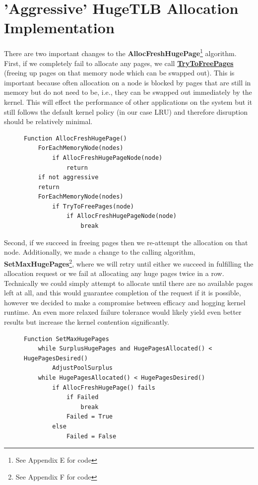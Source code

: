\documentclass{article}
\begin{document}
\section{'Aggressive' HugeTLB Allocation Implementation}
There are two important changes to the \textbf{AllocFreshHugePage}\footnote{See Appendix E for code}  algorithm. First, if we completely fail to allocate any pages, we call \href{http://lxr.free-electrons.com/source/mm/vmscan.c?v=3.10#L2358}{\textbf{TryToFreePages}} (freeing up pages on that memory node which can be swapped out). This is important because often allocation on a node is blocked by pages that are still in memory but do not need to be, i.e., they can be swapped out immediately by the kernel. This will effect the performance of other applications on the system but it still follows the default kernel policy (in our case LRU) and therefore disruption should be relatively minimal.

\begin{figure}[h]
\begin{verbatim}
Function AllocFreshHugePage()
    ForEachMemoryNode(nodes)
        if AllocFreshHugePageNode(node)
            return
    if not aggressive
	return
    ForEachMemoryNode(nodes)
        if TryToFreePages(node)
            if AllocFreshHugePageNode(node)
                break
\end{verbatim}
\end{figure}

Second, if we succeed in freeing pages then we re-attempt the allocation on that node. Additionally, we made a change to the calling algorithm, \textbf{SetMaxHugePages}\footnote{See Appendix F for code}, where we will retry until either we succeed in fulfilling the allocation request or we fail at allocating any huge pages twice in a row. Technically we could simply attempt to allocate until there are no available pages left at all, and this would guarantee completion of the request if it is possible, however we decided to make a compromise between efficacy and hogging kernel runtime. An even more relaxed failure tolerance would likely yield even better results but increase the kernel contention significantly.

\begin{figure}[h]
\begin{verbatim}
Function SetMaxHugePages
    while SurplusHugePages and HugePagesAllocated() < HugePagesDesired()
        AdjustPoolSurplus
    while HugePagesAllocated() < HugePagesDesired()
        if AllocFreshHugePage() fails
            if Failed
                break
            Failed = True
        else
            Failed = False
\end{verbatim}
\end{figure}
\end{document}
